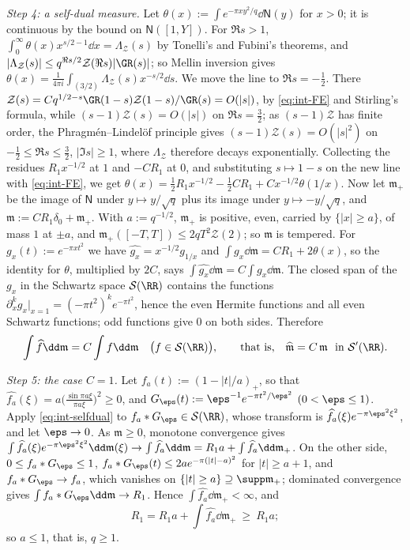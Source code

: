 \emph{Step 4: a self-dual measure.} Let $\theta(x):=\int e^{-\pi xy^2/q}\dd\mathsf N(y)$ for $x>0$; it is continuous by the bound on $\mathsf N([1,Y])$.
For $\Re s>1$, $\int_0^\infty\theta(x)x^{s/2-1}\dd x=\Lambda_{\mathcal Z}(s)$ by Tonelli's and Fubini's theorems, and $|\Lambda_{\mathcal Z}(s)|\le
q^{\Re s/2}\mathcal Z(\Re s)|\GR(s)|$; so Mellin inversion gives $\theta(x)=\frac1{4\pi i}\int_{(3/2)}\Lambda_{\mathcal Z}(s)x^{-s/2}\dd s$. We move the line
to $\Re s=-\frac12$. There $\mathcal Z(s)=Cq^{1/2-s}\GR(1-s)\mathcal Z(1-s)/\GR(s)=O(|s|)$, by \eqref{eq:int-FE} and Stirling's formula, while
$(s-1)\mathcal Z(s)=O(|s|)$ on $\Re s=\frac32$; as $(s-1)\mathcal Z$ has finite order, the Phragm\'en--Lindel\"of principle gives $(s-1)\mathcal Z(s)=O(|s|^2)$
on $-\frac12\le\Re s\le\frac32$, $|\Im s|\ge1$, where $\Lambda_{\mathcal Z}$ therefore decays exponentially. Collecting the residues $R_1x^{-1/2}$ at $1$ and
$-CR_1$ at $0$, and substituting $s\mapsto1-s$ on the new line with \eqref{eq:int-FE}, we get
$\theta(x)=\frac12R_1x^{-1/2}-\frac12CR_1+Cx^{-1/2}\theta(1/x)$. Now let $\mathfrak m_+$ be the image of $\mathsf N$ under $y\mapsto y/\sqrt q$ plus its
image under $y\mapsto-y/\sqrt q$, and $\mathfrak m:=CR_1\delta_0+\mathfrak m_+$. With $a:=q^{-1/2}$, $\mathfrak m_+$ is positive, even, carried by $\{|x|\ge a\}$,
of mass $1$ at $\pm a$, and $\mathfrak m_+([-T,T])\le2qT^2\mathcal Z(2)$; so $\mathfrak m$ is tempered. For $g_x(t):=e^{-\pi xt^2}$ we have
$\widehat{g_x}=x^{-1/2}g_{1/x}$ and $\int g_x\dd\mathfrak m=CR_1+2\theta(x)$, so the identity for $\theta$, multiplied by $2C$, says
$\int\widehat{g_x}\dd\mathfrak m=C\int g_x\dd\mathfrak m$. The closed span of the $g_x$ in the Schwartz space $\mathcal S(\RR)$ contains the functions
$\partial_x^kg_x|_{x=1}=(-\pi t^2)^ke^{-\pi t^2}$, hence the even Hermite functions and all even Schwartz functions; odd functions give $0$ on both
sides. Therefore
\begin{equation}\label{eq:int-selfdual}
\int\widehat f\dd\mathfrak m=C\int f\dd\mathfrak m\quad\big(f\in\mathcal S(\RR)\big),\qquad\text{that is,}\quad\widehat{\mathfrak m}=C\,\mathfrak m\ \text{ in }\mathcal S'(\RR).
\end{equation}

\emph{Step 5: the case $C=1$.} Let $f_a(t):=(1-|t|/a)_+$, so that $\widehat{f_a}(\xi)=a\big(\frac{\sin\pi a\xi}{\pi a\xi}\big)^2\ge0$, and
$G_\eps(t):=\eps^{-1}e^{-\pi t^2/\eps^2}$ $(0<\eps\le1)$. Apply \eqref{eq:int-selfdual} to $f_a*G_\eps\in\mathcal S(\RR)$, whose transform is
$\widehat{f_a}(\xi)e^{-\pi\eps^2\xi^2}$, and let $\eps\to0$. As $\mathfrak m\ge0$, monotone convergence gives
$\int\widehat{f_a}(\xi)e^{-\pi\eps^2\xi^2}\dd\mathfrak m(\xi)\to\int\widehat{f_a}\dd\mathfrak m=R_1a+\int\widehat{f_a}\dd\mathfrak m_+$. On the other side, $0\le f_a*G_\eps\le1$,
$f_a*G_\eps(t)\le2ae^{-\pi(|t|-a)^2}$ for $|t|\ge a+1$, and $f_a*G_\eps\to f_a$, which vanishes on $\{|t|\ge a\}\supseteq\supp\mathfrak m_+$; dominated
convergence gives $\int f_a*G_\eps\dd\mathfrak m\to R_1$. Hence $\int\widehat{f_a}\dd\mathfrak m_+<\infty$, and
\begin{equation}\label{eq:int-fejer}
R_1=R_1a+\int\widehat{f_a}\dd\mathfrak m_+\ \ge\ R_1a ;
\end{equation}
so $a\le1$, that is, $q\ge1$.

